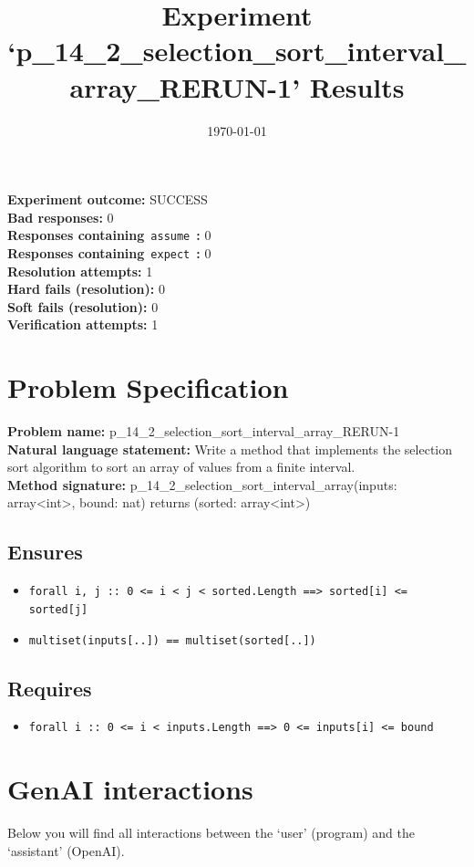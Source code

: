 \documentclass{article}
\begin{document}
\title{Experiment `p\_14\_2\_selection\_sort\_interval\_array\_RERUN-1' Results}
\author{\today}
\date{}
\maketitle
\textbf{Experiment outcome: }SUCCESS
\\\textbf{Bad responses: }0
\\\textbf{Responses containing}~\texttt{assume}~\textbf{: }0
\\\textbf{Responses containing}~\texttt{expect}~\textbf{: }0
\\\textbf{Resolution attempts: }1
\\\textbf{Hard fails (resolution): }0
\\\textbf{Soft fails (resolution): }0
\\\textbf{Verification attempts: }1
\section*{Problem Specification}
\textbf{Problem name: }p\_14\_2\_selection\_sort\_interval\_array\_RERUN-1
\\\textbf{Natural language statement: }Write a method that implements the selection sort algorithm to sort an array of values from a finite interval.
\\\textbf{Method signature: }p\_14\_2\_selection\_sort\_interval\_array(inputs: array<int>, bound: nat) returns (sorted: array<int>)
\subsection*{Ensures}
\begin{itemize}
\item \texttt{forall i, j :: 0 <= i < j < sorted.Length ==> sorted[i] <= sorted[j]}
\item \texttt{multiset(inputs[..]) == multiset(sorted[..])}
\end{itemize}
\subsection*{Requires}
\begin{itemize}
\item \texttt{forall i :: 0 <= i < inputs.Length ==> 0 <= inputs[i] <= bound}
\end{itemize}
\clearpage
\section*{GenAI interactions}
Below you will find all interactions between the `user' (program) and the `assistant' (OpenAI).
\end{document}
